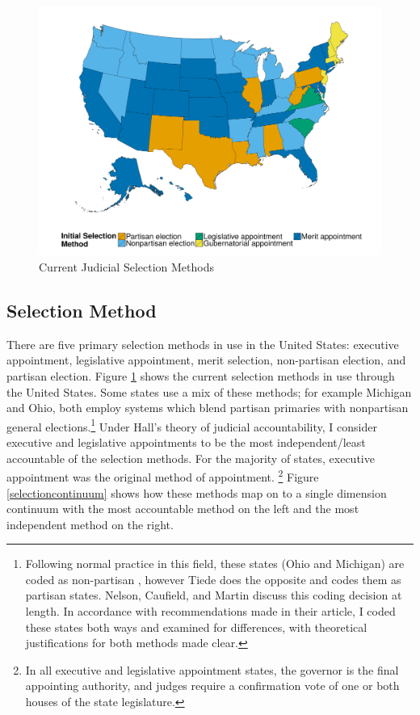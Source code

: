 \documentclass[12pt]{article}
\begin{document}
\begin{figure}[tbh]\centering\caption{Current Judicial Selection Methods}\label{selectionmap}
	\includegraphics[scale=.5]{graphics/colr_select.pdf}
\end{figure}

\subsection*{Selection Method}
There are five primary selection methods in use in the United States: executive appointment, legislative appointment, merit selection, non-partisan election, and partisan election. Figure \ref{selectionmap} shows the current selection methods in use through the United States.  Some states use a mix of these methods; for example Michigan and Ohio, both employ systems which blend partisan primaries with nonpartisan general elections.\footnote{Following normal practice in this field, these states (Ohio and Michigan) are coded as non-partisan \citep{Canes-Wrone2012, Caldarone2009}, however Tiede \citeyearpar{Tiede2006} does the opposite and codes them as partisan states. Nelson, Caufield, and Martin \citeyearpar{Nelson2013} discuss this coding decision at length.  In accordance with recommendations made in their article, I coded these states both ways and examined for differences, with theoretical justifications for both methods made clear.}    Under Hall's \citeyearpar{Hall2007} theory of judicial accountability, I consider executive and legislative appointments to be the most independent/least accountable of the selection methods.  For the majority of states, executive appointment was the original method of appointment.  \footnote{In all executive and legislative appointment states, the governor is the final appointing authority, and judges require a confirmation vote of one or both houses of the state legislature.}  Figure \ref{selectioncontinuum} shows how these methods map on to a single dimension continuum with the most accountable method on the left and the most independent method on the right. 
\end{document}
